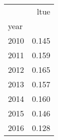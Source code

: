 \begin{tabular}{lr}
\toprule
 & ltue \\
year &  \\
\midrule
2010 & 0.145 \\
2011 & 0.159 \\
2012 & 0.165 \\
2013 & 0.157 \\
2014 & 0.160 \\
2015 & 0.146 \\
2016 & 0.128 \\
\bottomrule
\end{tabular}
